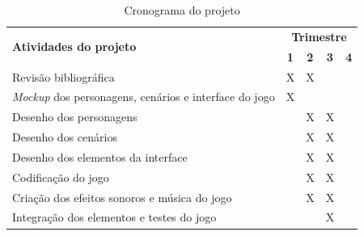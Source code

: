 \documentclass[article,12pt,openany,oneside,a4paper,english,brazil]{abntex2}
\begin{document}
\begin{table}[ht]
\centering
\caption{Cronograma do projeto}
\label{tb:cronograma}
\begin{tabular}{|p{13cm}|c|c|c|c|}
\hline
\multirow{2}{*}{\textbf{Atividades do projeto}} & \multicolumn{4}{c|}{\textbf{Trimestre}}                                                         \\ \cline{2-5} 
                                                                                                         & \textbf{1}            & \textbf{2}             & \textbf{3}             & \textbf{4}            \\ \hline
Revisão bibliográfica & X                     & X                      &                        &                          \\ \hline
\textit{Mockup} dos personagens, cenários e interface do jogo                                                     & X                     &                        &                        &                       \\ \hline
Desenho dos personagens                                                                                  & \multicolumn{1}{l|}{} & \multicolumn{1}{l|}{X} & \multicolumn{1}{l|}{X} & \multicolumn{1}{l|}{} \\ \hline
Desenho dos cenários                                                                                     & \multicolumn{1}{l|}{} & \multicolumn{1}{l|}{X} & \multicolumn{1}{l|}{X} & \multicolumn{1}{l|}{} \\ \hline
Desenho dos elementos da interface                                                                       & \multicolumn{1}{l|}{} & \multicolumn{1}{l|}{X} & \multicolumn{1}{l|}{X} & \multicolumn{1}{l|}{} \\ \hline
Codificação do jogo                                                                                      & \multicolumn{1}{l|}{} & \multicolumn{1}{l|}{X} & \multicolumn{1}{l|}{X} & \multicolumn{1}{l|}{} \\ \hline
Criação dos efeitos sonoros e música do jogo                                                             & \multicolumn{1}{l|}{} & \multicolumn{1}{l|}{X} & \multicolumn{1}{l|}{X} & \multicolumn{1}{l|}{} \\ \hline
Integração dos elementos e testes do jogo                                                                &                       &                        & X                      &                       \\ \hline

\end{tabular}
\end{table}
\end{document}
